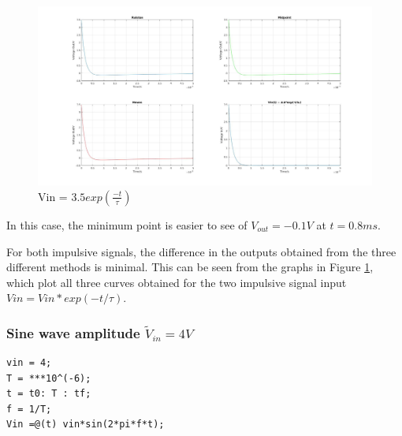 \documentclass[11pt,a4paper]{article}
\begin{document}
\begin{figure}[h]
	\includegraphics[width=\textwidth]{Ex1_Figs/subt.jpg}
	\vspace{-6mm}
	\caption{Vin = $3.5exp(\frac{-t}{\tau})$}
	\label{fig:RL4}
\end{figure}

In this case, the minimum point is easier to see of $V_{out} = -0.1V$ at $t = 0.8ms$.

For both impulsive signals, the difference in the outputs obtained from the three different methods is minimal. This can be seen from the graphs in Figure \ref{fig:RL4}, which plot all three curves obtained for the two impulsive signal input $Vin = Vin*exp(-t/\tau)$.

\newpage
\subsubsection{Sine wave amplitude $\tilde{V}_{in} = 4V$}

\begin{verbatim}
vin = 4;
T = ***10^(-6);
t = t0: T : tf;
f = 1/T;
Vin =@(t) vin*sin(2*pi*f*t);
\end{verbatim}
\end{document}
